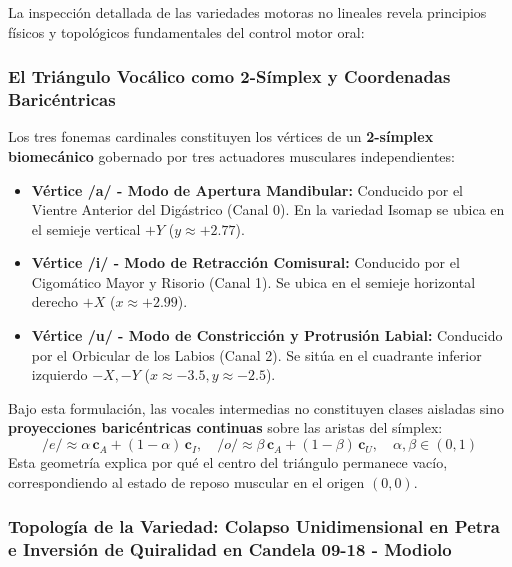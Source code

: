 \documentclass[11pt,a4paper]{article}
\begin{document}
La inspección detallada de las variedades motoras no lineales revela principios físicos y topológicos fundamentales del control motor oral:

\subsubsection{El Triángulo Vocálico como 2-Símplex y Coordenadas Baricéntricas}
\label{subsubsec:simplex_baricentrico}

Los tres fonemas cardinales constituyen los vértices de un \textbf{2-símplex biomecánico} gobernado por tres actuadores musculares independientes:
\begin{itemize}
    \item \textbf{Vértice /a/ - Modo de Apertura Mandibular:} Conducido por el Vientre Anterior del Digástrico (Canal 0). En la variedad Isomap se ubica en el semieje vertical $+Y$ ($y \approx +2.77$).
    \item \textbf{Vértice /i/ - Modo de Retracción Comisural:} Conducido por el Cigomático Mayor y Risorio (Canal 1). Se ubica en el semieje horizontal derecho $+X$ ($x \approx +2.99$).
    \item \textbf{Vértice /u/ - Modo de Constricción y Protrusión Labial:} Conducido por el Orbicular de los Labios (Canal 2). Se sitúa en el cuadrante inferior izquierdo $-X, -Y$ ($x \approx -3.5, y \approx -2.5$).
\end{itemize}

Bajo esta formulación, las vocales intermedias no constituyen clases aisladas sino \textbf{proyecciones baricéntricas continuas} sobre las aristas del símplex:
\begin{equation}
    /e/ \approx \alpha \, \mathbf{c}_A + (1-\alpha) \, \mathbf{c}_I, \quad /o/ \approx \beta \, \mathbf{c}_A + (1-\beta) \, \mathbf{c}_U, \quad \alpha, \beta \in (0, 1)
\end{equation}
Esta geometría explica por qué el centro del triángulo permanece vacío, correspondiendo al estado de reposo muscular en el origen $(0, 0)$.

\subsubsection{Topología de la Variedad: Colapso Unidimensional en Petra e Inversión de Quiralidad en Candela 09-18 - Modiolo}
\label{subsubsec:quiralidad_modiolo}
\end{document}
